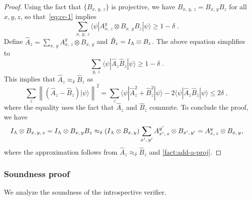 \documentclass[11pt]{article}
\theoremstyle{definition}
\newcommand{\ket}[1]{|#1\rangle}
\newcommand{\bra}[1]{\langle#1|}
\newcommand{\Id}{\ensuremath{I}}
\newcommand{\ia}{\Id_\alice}
\newcommand{\norm}[1]{\left\| {#1} \right\|}
\newcommand{\labelstyle}[1]{\ensuremath{\textsc{#1}}\xspace}
\newcommand{\alice}{\labelstyle{A}}
\begin{document}
\begin{proof}
  Using the fact that $\{B_{x,\, y,\, z}\}$ is projective, we have $B_{x,\, y,\, z} =
  B_{x,\, y} B_z$ for all $x,y,z$, so that~\eqref{eq:cc-1} implies
  \begin{equation*}
    \sum_{x,\, y,\, z} \bra{\psi} A^y_{x,\, z} \otimes B_{x,\, y} B_{z}
    \ket{\psi} \ge 1 - \delta\;.
  \end{equation*}
  Define $\hat{A}_z = \sum_{x,\, y} A^y_{x,\, z} \otimes B_{x,\, y}$ and
  $\hat{B}_z = \ia \otimes B_z$.
  The above equation simplifies to
  \begin{equation*}
    \sum_{y,\, z} \bra{\psi} \hat{A}_z \hat{B}_z \ket{\psi} \ge 1 - \delta\;.
  \end{equation*}
  This implies that $\hat{A}_z \approx_\delta \hat{B}_z$ as
  \begin{equation*}
    \sum_z \norm{(\hat{A}_z - \hat{B}_z) \ket{\psi}}^2 = \sum_z \bra{\psi}
    \hat{A}_z^2 + \hat{B}_z^2 \ket{\psi} - 2 \bra{\psi} \hat{A}_z \hat{B}_z
    \ket{\psi} \le 2 \delta\;,
  \end{equation*}
  where the equality uses the fact that $\hat{A}_z$ and $\hat{B}_z$ commute.
  To conclude the proof, we have
  \begin{equation*}
    \ia \otimes B_{x,\, y,\, z} = \ia \otimes B_{x,\, y} B_z \approx_\delta (\ia
    \otimes B_{x,\, y}) \sum_{x',\, y'} A^{y'}_{x',\, z} \otimes B_{x',\, y'} =
    A^y_{x,\, z} \otimes B_{x,\, y},
  \end{equation*}
  where the approximation follows from $\hat{A}_z \approx_\delta \hat{B}_z$ and
  \cref{fact:add-a-proj}.

\end{proof}

\subsubsection{Soundness proof}

We analyze the soundness of the introspective verifier.
\end{document}
